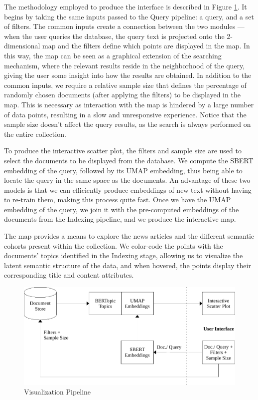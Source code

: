 \documentclass[a4paper]{article}
\begin{document}
The methodology employed to produce the interface is described in Figure \ref{vis_pipeline}. It begins by taking the same inputs passed to the Query pipeline: a query, and a set of filters. The common inputs create a connection between the two modules — when the user queries the database, the query text is projected onto the 2-dimensional map and the filters define which points are displayed in the map. In this way, the map can be seen as a graphical extension of the searching mechanism, where the relevant results reside in the neighborhood of the query, giving the user some insight into how the results are obtained. In addition to the common inputs, we require a relative sample size that defines the percentage of randomly chosen documents (after applying the filters) to be displayed in the map. This is necessary as interaction with the map is hindered by a large number of data points, resulting in a slow and unresponsive experience. Notice that the sample size doesn't affect the query results, as the search is always performed on the entire collection.

To produce the interactive scatter plot, the filters and sample size are used to select the documents to be displayed from the database. We compute the SBERT embedding of the query, followed by its UMAP embedding, thus being able to locate the query in the same space as the documents. An advantage of these two models is that we can efficiently produce embeddings of new text without having to re-train them, making this process quite fast. Once we have the UMAP embedding of the query, we join it with the pre-computed embeddings of the documents from the Indexing pipeline, and we produce the interactive map.

The map provides a means to explore the news articles and the different semantic cohorts present within the collection. We color-code the points with the documents' topics identified in the Indexing stage, allowing us to visualize the latent semantic structure of the data, and when hovered, the points display their corresponding title and content attributes.

\begin{figure}[H]
	\centering
	\includegraphics[scale=0.7]{./figures/vis_pipeline}
	\caption{Visualization Pipeline}
	\label{vis_pipeline}
\end{figure}
\end{document}
